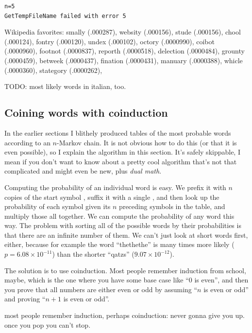 \documentclass[twocolumn]{article}
\begin{document}
\begin{verbatim}
n=5
GetTempFileName failed with error 5
\end{verbatim}

Wikipedia favorites: smally (.000287),
websity (.000156),
stude (.000156),
chool (.000124),
fontry (.000120),
undex (.000102),
octory (.0000990),
coibot (.0000960),
footnot (.0000837),
reporth (.0000518),
delection (.0000484),
grounty (.0000459),
betweek (.0000437),
fination (.0000431),
manuary (.0000388),
whicle (.0000360),
stategory (.0000262),


TODO: most likely words in italian, too.


\subsection{Coining words with coinduction} \label{sec:coin}

In the earlier sections I blithely produced tables of the most
probable words according to an $n$-Markov chain. It is not obvious how
to do this (or that it is even possible), so I explain the algorithm
in this section. It's safely skippable, I mean if you don't want to
know about a pretty cool algorithm that's not that complicated and
might even be new, plus {\em dual math}.

Computing the probability of an individual word is easy. We prefix it
with $n$ copies of the start symbol \<, suffix it with a single \>,
and then look up the probability of each symbol given its $n$
preceding symbols in the table, and multiply those all together. We
can compute the probability of any word this way. The problem with
sorting all of the possible words by their probabilities is that there
are an infinite number of them. We can't just look at short words
first, either, because for example the word ``thethethe'' is many
times more likely ($p = 6.08\times 10^{-11}$) than the shorter
``qatzs'' ($9.07\times 10^{-12}$).

The solution is to use coinduction. Most people remember induction
from school, maybe, which is the one where you have some base case
like ``0 is even'', and then you prove that all numbers are either
even or odd by assuming ``$n$ is even or odd'' and proving ``$n + 1$
is even or odd''. 

most people remember induction, perhaps 
coinduction: never gonna give you up. once you pop you can't stop.
\end{document}
